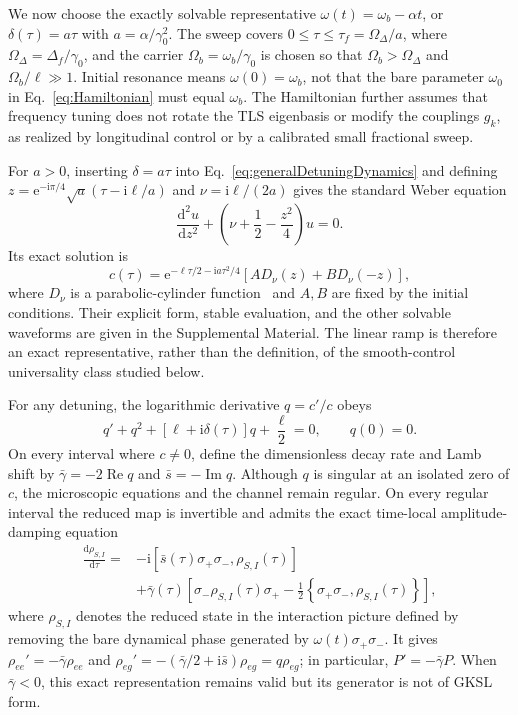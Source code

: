 \documentclass[reprint,superscriptaddress,floatfix,amsmath,amssymb,prresearch,aps]{revtex4-2}
\newcommand{\dd}{\mathrm{d}}
\newcommand{\ee}{\mathrm{e}}
\newcommand{\ii}{\mathrm{i}}
\newcommand{\Ree}{\operatorname{Re}}
\newcommand{\Imm}{\operatorname{Im}}
\begin{document}
We now choose the exactly solvable representative
\(\omega(t)=\omega_b-\alpha t\), or \(\delta(\tau)=a\tau\) with
\(a=\alpha/\gamma_0^2\). The sweep covers
\(0\leq\tau\leq\tau_f=\Omega_\Delta/a\), where
\(\Omega_\Delta=\Delta_f/\gamma_0\), and the carrier
\(\Omega_b=\omega_b/\gamma_0\) is chosen so that
\(\Omega_b>\Omega_\Delta\) and \(\Omega_b/\ell\gg1\). Initial resonance
means \(\omega(0)=\omega_b\), not that the bare parameter \(\omega_0\) in
Eq.~\eqref{eq:Hamiltonian} must equal \(\omega_b\). The Hamiltonian further
assumes that frequency tuning does not rotate the TLS eigenbasis or modify
the couplings \(g_k\), as realized by longitudinal control or by a calibrated
small fractional sweep.

For \(a>0\), inserting \(\delta=a\tau\) into
Eq.~\eqref{eq:generalDetuningDynamics} and defining
\(z=\ee^{-\ii\pi/4}\sqrt a(\tau-\ii\ell/a)\) and
\(\nu=\ii\ell/(2a)\) gives the standard Weber equation
\begin{equation}
\frac{\dd^2u}{\dd z^2}
+\left(\nu+\frac12-\frac{z^2}{4}\right)u=0.
\label{eq:standardWeber}
\end{equation}
Its exact solution is
\begin{equation}
c(\tau)=\ee^{-\ell\tau/2-\ii a\tau^2/4}
\left[A D_\nu(z)+B D_\nu(-z)\right],
\label{eq:Webersolution}
\end{equation}
where \(D_\nu\) is a parabolic-cylinder function~\cite{NIST2010} and \(A,B\)
are fixed by the initial conditions. Their explicit form, stable evaluation,
and the other solvable waveforms are given in the Supplemental Material. The
linear ramp is therefore an exact representative, rather than the definition,
of the smooth-control universality class studied below.

For any detuning, the logarithmic derivative \(q=c'/c\) obeys
\begin{equation}
q'+q^2+[\ell+\ii\delta(\tau)]q+\frac{\ell}{2}=0,
\qquad q(0)=0.
\label{eq:Riccati}
\end{equation}
On every interval where \(c\neq0\), define the dimensionless decay rate and
Lamb shift by \(\bar\gamma=-2\Ree q\) and \(\bar s=-\Imm q\). Although
\(q\) is singular at an isolated zero of \(c\), the microscopic equations and
the channel remain regular. On every regular interval the reduced map is
invertible and admits the exact time-local amplitude-damping equation
\begin{align}
\frac{\dd\rho_{S,I}}{\dd\tau}
={}&-\ii\left[
\bar s(\tau)\sigma_+\sigma_-,\rho_{S,I}(\tau)
\right]\nonumber\\
&+\bar\gamma(\tau)
\left[
\sigma_-\rho_{S,I}(\tau)\sigma_+
-\frac12\left\{\sigma_+\sigma_-,\rho_{S,I}(\tau)\right\}
\right],
\label{eq:exactTimeLocalME}
\end{align}
where \(\rho_{S,I}\) denotes the reduced state in the interaction picture
defined by removing the bare dynamical phase generated by
\(\omega(t)\sigma_+\sigma_-\). It gives
\(\rho_{ee}'=-\bar\gamma\rho_{ee}\) and
\(\rho_{eg}'=-(\bar\gamma/2+\ii\bar s)\rho_{eg}=q\rho_{eg}\); in
particular, \(P'=-\bar\gamma P\). When \(\bar\gamma<0\), this exact
representation remains valid but its generator is not of GKSL form.
\end{document}
